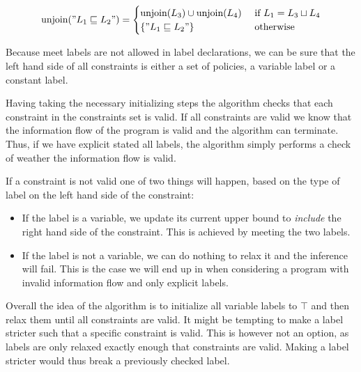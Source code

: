 \[
\text{unjoin}("L_1 \sqsubseteq L_2") =
\begin{cases}
  \text{unjoin}(L_3) \cup \text{unjoin}(L_4) & \text{ if } L_1 = L_3 \sqcup L_4\\
  \{"L_1 \sqsubseteq L_2"\} & \text{ otherwise}
\end{cases}
\]

Because meet labels are not allowed in label declarations, we can be sure that the left hand side of all constraints is either a set of policies, a variable label or a constant label.

Having taking the necessary initializing steps the algorithm checks that each constraint in the constraints set is valid.
If all constraints are valid we know that the information flow of the program is valid and the algorithm can terminate.
Thus, if we have explicit stated all labels, the algorithm simply performs a check of weather the information flow is valid.

If a constraint is not valid one of two things will happen, based on the type of label on the left hand side of the constraint:
\begin{itemize}
  \item If the label is a variable, we update its current upper bound to \textit{include} the right hand side of the constraint.
  This is achieved by meeting the two labels.
  \item If the label is not a variable, we can do nothing to relax it and the inference will fail.
  This is the case we will end up in when considering a program with invalid information flow and only explicit labels.
\end{itemize}

Overall the idea of the algorithm is to initialize all variable labels to $\top$ and then relax them until all constraints are valid.
It might be tempting to make a label stricter such that a specific constraint is valid.
This is however not an option, as labels are only relaxed exactly enough that constraints are valid.
Making a label stricter would thus break a previously checked label.

